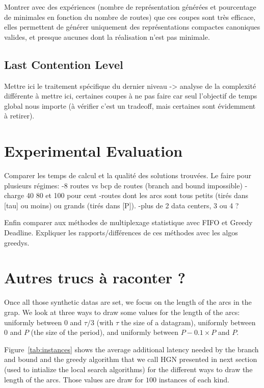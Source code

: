 Montrer avec des expériences (nombre de représentation générées et pourcentage de minimales en fonction du nombre de routes) que ces coupes sont très efficace, elles permettent de générer uniquement des représentations compactes canoniques valides, et presque aucunes dont la réalisation n'est pas minimale.

\subsection{Last Contention Level}

Mettre ici le traitement spécifique du dernier niveau -> analyse de la complexité différente 
à mettre ici, certaines coupes à ne pas faire car seul l'objectif de temps global nous importe 
(à vérifier c'est un tradeoff, mais certaines sont évidemment à retirer). 


\section{Experimental Evaluation}

Comparer les temps de calcul et la qualité des solutions trouvées. 
Le faire pour plusieurs régimes:
-8 routes vs bcp de routes (branch and bound impossible)
-charge 40 80 et 100 pour cent
-routes dont les arcs sont tous petits (tirés dans [tau] ou moins) ou grands (tirés dans [P]).
-plus de 2 data centers, 3 ou 4 ?

Enfin comparer aux méthodes de multiplexage statistique avec FIFO et Greedy Deadline.
Expliquer les rapports/différences de ces méthodes avec les algos greedys.



\section{Autres trucs à raconter ?}
Once all those synthetic datas are set, we focus on the length of the arcs in the grap. We look at three ways to draw some values for the length of the arcs: uniformly between $0$ and $\tau/3$ (with $\tau$ the size of a datagram), uniformly between $0$ and $P$ (the size of the period), and uniformly between $P-0.1\times P$ and $P$.

Figure~\ref{tab:instances} shows the average additional latency needed by the branch and bound and the greedy algorithm that we call HGN presented in next section (used to intialize the local search algorithms) for the different ways to draw the length of the arcs. Those values are draw for $100$ instances of each kind.


